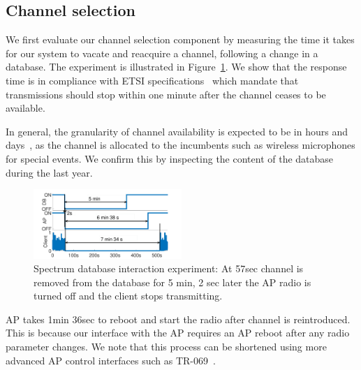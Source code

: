 \subsection{Channel selection}
\label{sec:database-eval}
We first evaluate our channel selection component by measuring the time it takes for our system to vacate and reacquire a channel, following a change in a database. The experiment is illustrated in Figure~\ref{fig:paws}.
We show that the response time is 
in compliance with ETSI specifications~\cite{etsi_tvws} which mandate that transmissions should stop within one minute after the channel ceases to be available.

In general, the granularity of channel availability is expected to be in hours and days~\cite{Rice_af}, as the channel is allocated to the incumbents such as wireless microphones for special events. We confirm this by inspecting the content of the database during the last year. 
 

\begin{figure}[htb!]
  \vskip -12pt
  \centering
  \hskip -8pt
    \includegraphics[width=0.5\textwidth]{./figs/paws.pdf}
  \vskip -6pt
  \caption{Spectrum database interaction experiment: At 57sec channel is removed from the database for 5 min, 2 sec later the AP radio is turned off and the client stops transmitting.}
  \label{fig:paws}
  \vskip -6pt
\end{figure}


AP takes 1min 36sec to reboot and start the radio after channel is reintroduced. This is because our interface with the AP requires an AP reboot after any radio parameter changes. We note that this process can be shortened using more advanced AP control interfaces such as TR-069~\cite{tr69}. 

